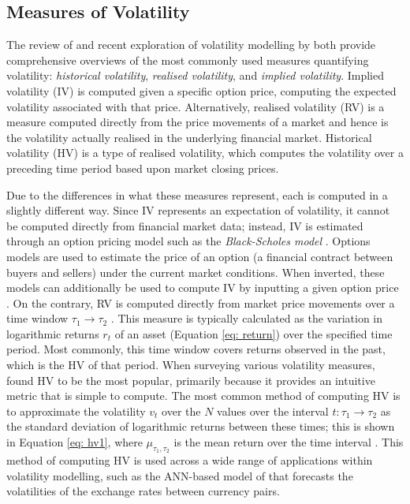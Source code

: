\documentclass[a4paper, 11pt]{report}
\begin{document}
    \subsection{Measures of Volatility}

    The review of \citet{ge-2022} and recent exploration of volatility modelling by \citet{tino-2001} both provide comprehensive overviews of the most commonly used measures quantifying volatility: \emph{historical volatility}, \emph{realised volatility}, and \emph{implied volatility}. Implied volatility (IV) is computed given a specific option price, computing the expected volatility associated with that price. Alternatively, realised volatility (RV) is a measure computed directly from the price movements of a market and hence is the volatility actually realised in the underlying financial market. Historical volatility (HV) is a type of realised volatility, which computes the volatility over a preceding time period based upon market closing prices.

    Due to the differences in what these measures represent, each is computed in a slightly different way. Since IV represents an expectation of volatility, it cannot be computed directly from financial market data; instead, IV is estimated through an option pricing model such as the \emph{Black-Scholes model} \citep{black-1973}. Options models are used to estimate the price of an option (a financial contract between buyers and sellers) under the current market conditions. When inverted, these models can additionally be used to compute IV by inputting a given option price \citep{tino-2001}. On the contrary, RV is computed directly from market price movements over a time window $\tau_1 \to \tau_2$ \citep{ge-2022}. This measure is typically calculated as the variation in logarithmic returns $r_t$ of an asset (Equation \ref{eq: return}) over the specified time period. Most commonly, this time window covers returns observed in the past, which is the HV of that period. When surveying various volatility measures, \citet{ge-2022} found HV to be the most popular, primarily because it provides an intuitive metric that is simple to compute. The most common method of computing HV is to approximate the volatility $v_t$ over the $N$ values over the interval $t \colon \tau_1 \to \tau_2$ as the standard deviation of logarithmic returns between these times; this is shown in Equation \ref{eq: hv1}, where $\mu_{\tau_1, \tau_2}$ is the mean return over the time interval \citep{ge-2022}. This method of computing HV is used across a wide range of applications within volatility modelling, such as the ANN-based model of \citet{lahmiri-2017} that forecasts the volatilities of the exchange rates between currency pairs.
\end{document}
